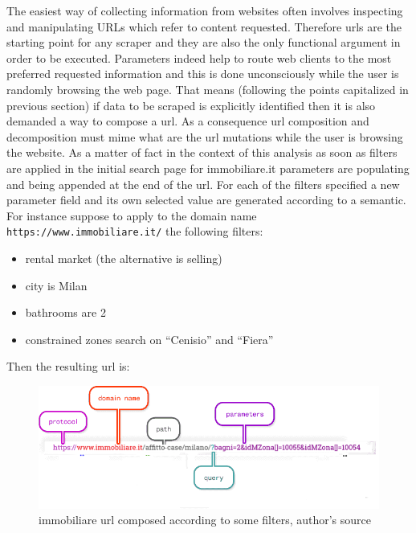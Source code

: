 \documentclass[
  12pt,
  a4paper,
  oneside]{book}
\providecommand{\tightlist}{%
  \setlength{\itemsep}{0pt}\setlength{\parskip}{0pt}}
\theoremstyle{definition}
\theoremstyle{definition}
\theoremstyle{definition}
\theoremstyle{remark}
\begin{document}
The easiest way of collecting information from websites often involves inspecting and manipulating URLs which refer to content requested. Therefore urls are the starting point for any scraper and they are also the only functional argument in order to be executed. Parameters indeed help to route web clients to the most preferred requested information and this is done unconsciously while the user is randomly browsing the web page. That means (following the points capitalized in previous section) if data to be scraped is explicitly identified then it is also demanded a way to compose a url. As a consequence url composition and decomposition must mime what are the url mutations while the user is browsing the website. As a matter of fact in the context of this analysis as soon as filters are applied in the initial search page for immobiliare.it parameters are populating and being appended at the end of the url. For each of the filters specified a new parameter field and its own selected value are generated according to a semantic. For instance suppose to apply to the domain name \texttt{https://www.immobiliare.it/} the following filters:

\begin{itemize}
\tightlist
\item
  rental market (the alternative is selling)
\item
  city is Milan
\item
  bathrooms are 2
\item
  constrained zones search on ``Cenisio'' and ``Fiera''
\end{itemize}

Then the resulting url is:

\begin{figure}
\centering
\includegraphics{images/immobiliare_url.png}
\caption{\label{fig:urlanatomy}immobiliare url composed according to some filters, author's source}
\end{figure}
\end{document}
